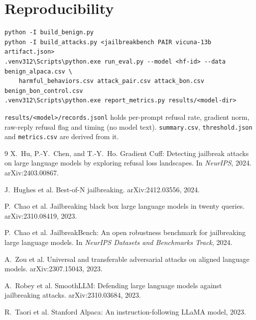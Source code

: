 \documentclass[11pt,a4paper]{article}
\newcommand{\code}[1]{\texttt{#1}}
\begin{document}
\section{Reproducibility}

\begin{small}
\begin{verbatim}
python -I build_benign.py
python -I build_attacks.py <jailbreakbench PAIR vicuna-13b artifact.json>
.venv312\Scripts\python.exe run_eval.py --model <hf-id> --data benign_alpaca.csv \
    harmful_behaviors.csv attack_pair.csv attack_bon.csv benign_bon_control.csv
.venv312\Scripts\python.exe report_metrics.py results/<model-dir>
\end{verbatim}
\end{small}

\code{results/<model>/records.jsonl} holds per-prompt refusal rate, gradient norm, raw-reply refusal flag and timing (no model text). \code{summary.csv}, \code{threshold.json} and \code{metrics.csv} are derived from it.

\begin{thebibliography}{9}
X.~Hu, P.-Y.~Chen, and T.-Y.~Ho.
\newblock Gradient Cuff: Detecting jailbreak attacks on large language models by exploring refusal loss landscapes.
\newblock In \emph{NeurIPS}, 2024. arXiv:2403.00867.

J.~Hughes et al.
\newblock Best-of-N jailbreaking.
\newblock arXiv:2412.03556, 2024.

P.~Chao et al.
\newblock Jailbreaking black box large language models in twenty queries.
\newblock arXiv:2310.08419, 2023.

P.~Chao et al.
\newblock JailbreakBench: An open robustness benchmark for jailbreaking large language models.
\newblock In \emph{NeurIPS Datasets and Benchmarks Track}, 2024.

A.~Zou et al.
\newblock Universal and transferable adversarial attacks on aligned language models.
\newblock arXiv:2307.15043, 2023.

A.~Robey et al.
\newblock SmoothLLM: Defending large language models against jailbreaking attacks.
\newblock arXiv:2310.03684, 2023.

R.~Taori et al.
\newblock Stanford Alpaca: An instruction-following LLaMA model, 2023.
\end{thebibliography}
\end{document}
